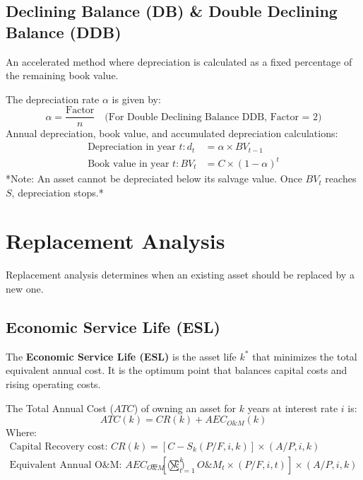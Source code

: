 \documentclass[12pt,a4paper]{article}
\begin{document}
\subsection{Declining Balance (DB) \& Double Declining Balance (DDB)}
An accelerated method where depreciation is calculated as a fixed percentage of the remaining book value.
\begin{tcolorbox}[formulabox, title={\textbf{Declining Balance Formulas}}]
The depreciation rate $\alpha$ is given by:
\begin{equation}
  \alpha = \frac{\text{Factor}}{n} \quad \text{(For Double Declining Balance DDB, Factor = 2)}
\end{equation}
Annual depreciation, book value, and accumulated depreciation calculations:
\begin{align}
  \text{Depreciation in year } t: d_t &= \alpha \times BV_{t-1} \\[4pt]
  \text{Book value in year } t: BV_t &= C \times (1 - \alpha)^t
\end{align}
*Note: An asset cannot be depreciated below its salvage value. Once $BV_t$ reaches $S$, depreciation stops.*
\end{tcolorbox}

\section{Replacement Analysis}

Replacement analysis determines when an existing asset should be replaced by a new one.

\subsection{Economic Service Life (ESL)}
The \textbf{Economic Service Life (ESL)} is the asset life $k^*$ that minimizes the total equivalent annual cost. It is the optimum point that balances capital costs and rising operating costs.

\begin{tcolorbox}[formulabox, title={\textbf{Total Annual Cost Equation}}]
The Total Annual Cost ($ATC$) of owning an asset for $k$ years at interest rate $i$ is:
\begin{equation}
  ATC(k) = CR(k) + AEC_{O\&M}(k)
\end{equation}
Where:
\begin{align}
  \text{Capital Recovery cost: } CR(k) &= [C - S_k(P/F, i, k)] \times (A/P, i, k) \\[4pt]
  \text{Equivalent Annual O\&M: } AEC_{O\&M}(k) &= \left[ \sum_{t=1}^{k} O\&M_t \times (P/F, i, t) \right] \times (A/P, i, k)
\end{align}
\end{tcolorbox}
\end{document}
